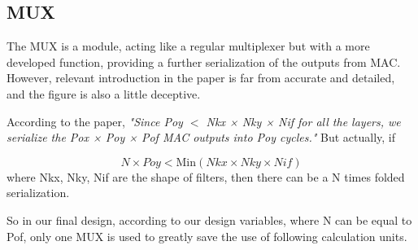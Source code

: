 \subsection{MUX}

The MUX is a module, acting like a regular multiplexer but with a more developed function, providing a further serialization of the outputs from MAC. However, relevant introduction in the paper is far from accurate and detailed, and the figure is also a little deceptive.

According to the paper, \textit{"Since Poy $<$ Nkx × Nky × Nif for all the layers, we serialize the Pox × Poy × Pof MAC outputs into Poy cycles."} But actually, if

\begin{equation*}
    N \times Poy < \mathrm{Min}(Nkx \times Nky \times Nif)
\end{equation*}
where Nkx, Nky, Nif are the shape of filters, then there can be a N times folded serialization.

So in our final design, according to our design variables, where N can be equal to Pof, only one MUX is used to greatly save the use of following calculation units.
